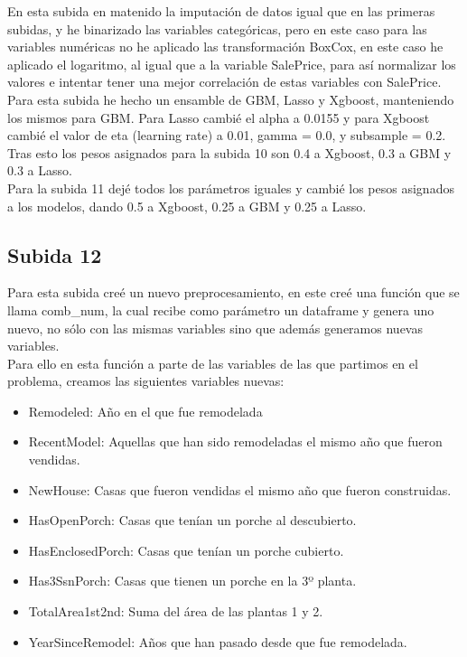 \documentclass[14pt]{extarticle}
\begin{document}
En esta subida en matenido la imputación de datos igual que en las primeras subidas, y he binarizado las variables categóricas, pero en este caso para las variables numéricas no he aplicado las transformación BoxCox, en este caso he aplicado el logaritmo, al igual que a la variable SalePrice, para así normalizar los valores e intentar tener una mejor correlación de estas variables con SalePrice. \\

Para esta subida he hecho un ensamble de GBM, Lasso y Xgboost, manteniendo los mismos para GBM. Para Lasso cambié el alpha a 0.0155 y para Xgboost cambié el valor de eta (learning rate) a 0.01, gamma = 0.0, y subsample = 0.2. \\

Tras esto los pesos asignados para la subida 10 son 0.4 a Xgboost, 0.3 a GBM y 0.3 a Lasso.\\

Para la subida 11 dejé todos los parámetros iguales y cambié los pesos asignados a los modelos, dando 0.5 a Xgboost, 0.25 a GBM y 0.25 a Lasso.\\

\subsection{Subida 12}

Para esta subida creé un nuevo preprocesamiento, en este creé una función que se llama comb\_num, la cual recibe como parámetro un dataframe y genera uno nuevo, no sólo con las mismas variables sino que además generamos nuevas variables. \\

Para ello en esta función a parte de las variables de las que partimos en el problema, creamos las siguientes variables nuevas:

\begin{itemize}
	\item Remodeled: Año en el que fue remodelada
	\item RecentModel: Aquellas que han sido remodeladas el mismo año que fueron vendidas.
	\item NewHouse: Casas que fueron vendidas el mismo año que fueron construidas.
	\item HasOpenPorch: Casas que tenían un porche al descubierto.
	\item HasEnclosedPorch: Casas que tenían un porche cubierto.
	\item Has3SsnPorch: Casas que tienen un porche en la 3º planta.
	\item TotalArea1st2nd: Suma del área de las plantas 1 y 2.
	\item YearSinceRemodel: Años que han pasado desde que fue remodelada. 
\end{itemize}
\end{document}
